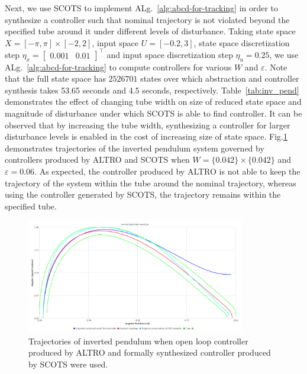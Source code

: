 Next, we use SCOTS to implement ALg.~\ref{alg:abcd-for-tracking} in order to synthesize a controller such that nominal trajectory is not violated beyond the specified tube around it under different levels of disturbance. Taking state space $X=[-\pi,\pi]\times[-2,2]$, input space $U=[-0.2,3]$, state space discretization step $\eta_x=\begin{bmatrix}0.001&0.01\end{bmatrix}^\top$ and input space discretization step $\eta_u=0.25$, we use ALg.~\ref{alg:abcd-for-tracking} to compute controllers for various $W$ and $\varepsilon$. Note that the full state space has $2526701$ states over which abstraction and controller synthesis takes 53.65 seconds and 4.5 seconds, respectively. Table~\ref{tab:inv_pend} demonstrates the effect of changing tube width on size of reduced state space and magnitude of disturbance under which SCOTS is able to find controller. It can be observed that by increasing the tube width, synthesizing a controller for larger disturbance levels is enabled in the cost of increasing size of state space. Fig.\ref{fig:invpend_traj} demonstrates trajectories of the inverted pendulum system governed by controllers produced by ALTRO and SCOTS when $W=\{0.042\}\times \{0.042\}$ and $\varepsilon=0.06$. As expected, the controller produced by ALTRO is not able to keep the trajectory of the system within the tube around the nominal trajectory, whereas using the controller generated by SCOTS, the trajectory remains within the specified tube.
\begin{figure}[t]\label{fig:invpend_traj}
	\centering
	\includegraphics[width=0.85\textwidth]{traj_inv_pend.png}
	\caption{Trajectories of inverted pendulum when open loop controller produced by ALTRO and formally synthesized controller produced by SCOTS were used.}
\end{figure}
